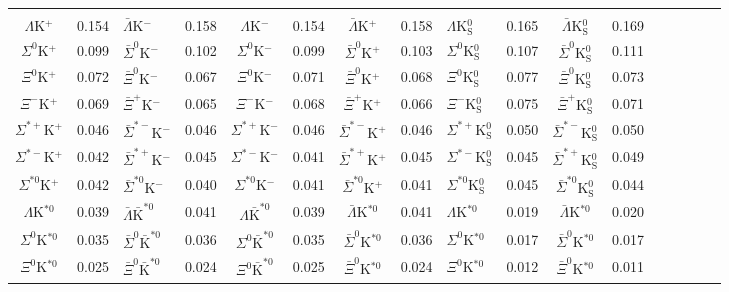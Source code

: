 \documentclass[ALICE,manyauthors]{cernphprep}
\begin{document}
\begin{landscape}
\begin{table}[htbp]
{\begin{tabular}{|c|cV{5.0}c|cV{5.0}c|cV{5.0}c|cV{5.0}c|cV{5.0}c|c|}
   \\
  $\Lambda$K$^{+}$ & 0.154 & $\bar{\Lambda}$K$^{-}$ & 0.158 & $\Lambda$K$^{-}$ & 0.154 & $\bar{\Lambda}$K$^{+}$ & 0.158 & $\Lambda$K$^{0}_{\mathrm{S}}$ & 0.165 & $\bar{\Lambda}$K$^{0}_{\mathrm{S}}$ & 0.169 \\
  $\Sigma^{0}$K$^{+}$ & 0.099 & $\bar{\Sigma}^{0}$K$^{-}$ & 0.102 & $\Sigma^{0}$K$^{-}$ & 0.099 & $\bar{\Sigma}^{0}$K$^{+}$ & 0.103 & $\Sigma^{0}$K$^{0}_{\mathrm{S}}$ & 0.107 & $\bar{\Sigma}^{0}$K$^{0}_{\mathrm{S}}$ & 0.111 \\
  $\Xi^{0}$K$^{+}$ & 0.072 & $\bar{\Xi}^{0}$K$^{-}$ & 0.067 & $\Xi^{0}$K$^{-}$ & 0.071 & $\bar{\Xi}^{0}$K$^{+}$ & 0.068 & $\Xi^{0}$K$^{0}_{\mathrm{S}}$ & 0.077 & $\bar{\Xi}^{0}$K$^{0}_{\mathrm{S}}$ & 0.073 \\
  $\Xi^{-}$K$^{+}$ & 0.069 & $\bar{\Xi}^{+}$K$^{-}$ & 0.065 & $\Xi^{-}$K$^{-}$ & 0.068 & $\bar{\Xi}^{+}$K$^{+}$ & 0.066 & $\Xi^{-}$K$^{0}_{\mathrm{S}}$ & 0.075 & $\bar{\Xi}^{+}$K$^{0}_{\mathrm{S}}$ & 0.071 \\
  $\Sigma^{*+}$K$^{+}$ & 0.046 & $\bar{\Sigma}^{*-}$K$^{-}$ & 0.046 & $\Sigma^{*+}$K$^{-}$ & 0.046 & $\bar{\Sigma}^{*-}$K$^{+}$ & 0.046 & $\Sigma^{*+}$K$^{0}_{\mathrm{S}}$ & 0.050 & $\bar{\Sigma}^{*-}$K$^{0}_{\mathrm{S}}$ & 0.050 \\
  $\Sigma^{*-}$K$^{+}$ & 0.042 & $\bar{\Sigma}^{*+}$K$^{-}$ & 0.045 & $\Sigma^{*-}$K$^{-}$ & 0.041 & $\bar{\Sigma}^{*+}$K$^{+}$ & 0.045 & $\Sigma^{*-}$K$^{0}_{\mathrm{S}}$ & 0.045 & $\bar{\Sigma}^{*+}$K$^{0}_{\mathrm{S}}$ & 0.049 \\
  $\Sigma^{*0}$K$^{+}$ & 0.042 & $\bar{\Sigma}^{*0}$K$^{-}$ & 0.040 & $\Sigma^{*0}$K$^{-}$ & 0.041 & $\bar{\Sigma}^{*0}$K$^{+}$ & 0.041 & $\Sigma^{*0}$K$^{0}_{\mathrm{S}}$ & 0.045 & $\bar{\Sigma}^{*0}$K$^{0}_{\mathrm{S}}$ & 0.044 \\
  $\Lambda$K$^{*0}$ & 0.039 & $\bar{\Lambda}\bar{\mathrm{K}}^{*0}$ & 0.041 & $\Lambda\bar{\mathrm{K}}^{*0}$ & 0.039 & $\bar{\Lambda}$K$^{*0}$ & 0.041 & $\Lambda$K$^{*0}$ & 0.019 & $\bar{\Lambda}$K$^{*0}$ & 0.020 \\
  $\Sigma^{0}$K$^{*0}$ & 0.035 & $\bar{\Sigma}^{0}\bar{\mathrm{K}}^{*0}$ & 0.036 & $\Sigma^{0}\bar{\mathrm{K}}^{*0}$ & 0.035 & $\bar{\Sigma}^{0}$K$^{*0}$ & 0.036 & $\Sigma^{0}$K$^{*0}$ & 0.017 & $\bar{\Sigma}^{0}$K$^{*0}$ & 0.017 \\
  $\Xi^{0}$K$^{*0}$ & 0.025 & $\bar{\Xi}^{0}\bar{\mathrm{K}}^{*0}$ & 0.024 & $\Xi^{0}\bar{\mathrm{K}}^{*0}$ & 0.025 & $\bar{\Xi}^{0}$K$^{*0}$ & 0.024 & $\Xi^{0}$K$^{*0}$ & 0.012 & $\bar{\Xi}^{0}$K$^{*0}$ & 0.011 \\

\end{tabular}}
\end{table}
\end{landscape}
\end{document}
